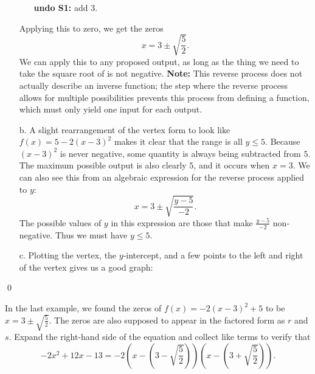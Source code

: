 \begin{eg}
\begin{enumerate}
\begin{itemize}
\item[\bf undo S1:] add $3$.
\end{itemize}
Applying this to zero, we get the zeros
\[
x = 3\pm \sqrt{\frac{5}{2}}.
\]
We can apply this to any proposed output, as long as the thing we need to take the square root of is not negative. {\bf Note:} This reverse process does not actually describe an inverse function; the step where the reverse process allows for multiple possibilities prevents this process from defining a function, which must only yield one input for each output.
\item[b.] A slight rearrangement of the vertex form to look like $f(x) = 5-2(x-3)^2$ makes it clear that the range is all $y\leq 5$. Because $(x-3)^2$ is never negative, some quantity is always being subtracted from $5$. The maximum possible output is also clearly $5$, and it occurs when $x=3$. We can also see this from an algebraic expression for the reverse process applied to $y$:
\[
x = 3\pm\sqrt{\frac{y-5}{-2}}.
\]
The possible values of $y$ in this expression are those that make $\frac{y-5}{-2}$ non-negative. Thus we must have $y\leq 5$. 
\item[c.] Plotting the vertex, the $y$-intercept, and a few points to the left and right of the vertex gives us a good graph:

\begin{figure}[h]
\centering
{} 
\end{figure}
\end{enumerate}
\qed \end{eg}

\pagebreak

\begin{question} In the last example, we found the zeros of $f(x) = -2(x-3)^2+5$ to be $x=3\pm \sqrt{\frac{5}{2}}$. The zeros are also supposed to appear in the factored form as $r$ and $s$. Expand the right-hand side of the equation and collect like terms to verify that
\[
-2x^2+12x-13 = -2\left(x-\left(3-\sqrt{\frac{5}{2}}\right)\right)\left(x-\left(3+\sqrt{\frac{5}{2}}\right)\right).
\]
\end{question}

